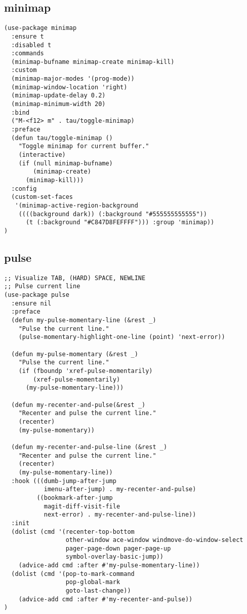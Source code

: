 \documentclass[11pt]{article}
\begin{document}
\subsection*{minimap}
\label{sec:org6c9f088}

\begin{verbatim}
(use-package minimap
  :ensure t
  :disabled t
  :commands
  (minimap-bufname minimap-create minimap-kill)
  :custom
  (minimap-major-modes '(prog-mode))
  (minimap-window-location 'right)
  (minimap-update-delay 0.2)
  (minimap-minimum-width 20)
  :bind
  ("M-<f12> m" . tau/toggle-minimap)
  :preface
  (defun tau/toggle-minimap ()
    "Toggle minimap for current buffer."
    (interactive)
    (if (null minimap-bufname)
        (minimap-create)
      (minimap-kill)))
  :config
  (custom-set-faces
   '(minimap-active-region-background
    ((((background dark)) (:background "#555555555555"))
      (t (:background "#C847D8FEFFFF"))) :group 'minimap))
)
\end{verbatim}

\subsection*{pulse}
\label{sec:org2861b3c}

\begin{verbatim}
;; Visualize TAB, (HARD) SPACE, NEWLINE
;; Pulse current line
(use-package pulse
  :ensure nil
  :preface
  (defun my-pulse-momentary-line (&rest _)
    "Pulse the current line."
    (pulse-momentary-highlight-one-line (point) 'next-error))

  (defun my-pulse-momentary (&rest _)
    "Pulse the current line."
    (if (fboundp 'xref-pulse-momentarily)
        (xref-pulse-momentarily)
      (my-pulse-momentary-line)))

  (defun my-recenter-and-pulse(&rest _)
    "Recenter and pulse the current line."
    (recenter)
    (my-pulse-momentary))

  (defun my-recenter-and-pulse-line (&rest _)
    "Recenter and pulse the current line."
    (recenter)
    (my-pulse-momentary-line))
  :hook (((dumb-jump-after-jump
           imenu-after-jump) . my-recenter-and-pulse)
         ((bookmark-after-jump
           magit-diff-visit-file
           next-error) . my-recenter-and-pulse-line))
  :init
  (dolist (cmd '(recenter-top-bottom
                 other-window ace-window windmove-do-window-select
                 pager-page-down pager-page-up
                 symbol-overlay-basic-jump))
    (advice-add cmd :after #'my-pulse-momentary-line))
  (dolist (cmd '(pop-to-mark-command
                 pop-global-mark
                 goto-last-change))
    (advice-add cmd :after #'my-recenter-and-pulse))
)
\end{verbatim}
\end{document}
